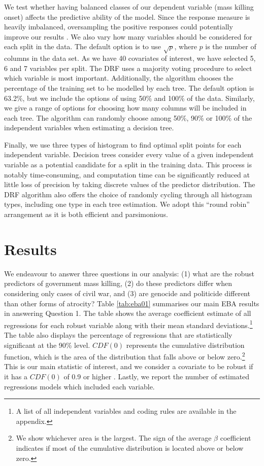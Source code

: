 \documentclass[a4paper,12pt]{article}
\begin{document}
We test whether having balanced classes of our dependent variable (mass killing onset) affects the predictive ability of the model. Since the response measure is heavily imbalanced, oversampling the positive responses could potentially improve our results \citep{chawla2004special,del2014use,japkowicz2002class}. 
We also vary how many variables should be considered for each split in the data. The default option is to use $\sqrt{p}$, where $p$ is the number of columns in the data set. As we have 40 covariates of interest, we have selected 5, 6 and 7 variables per split. The DRF uses a majority voting procedure to select which variable is most important. Additionally, the algorithm chooses the percentage of the training set to be modelled by each tree. The default option is 63.2\%, but we include the options of using 50\% and 100\% of the data. Similarly, we give a range of options for choosing how many columns will be included in each tree. The algorithm can randomly choose among 50\%, 90\% or 100\% of the independent variables when estimating a decision tree.

Finally, we use three types of histogram to find optimal split points for each independent variable. Decision trees consider every value of a given independent variable as a potential candidate for a split in the training data. This process is notably time-consuming, and computation time can be significantly reduced at little loss of precision by taking discrete values of the predictor distribution. The DRF algorithm also offers the choice of randomly cycling through all histogram types, including one type in each tree estimation. We adopt this ``round robin'' arrangement as it is both efficient and parsimonious.
	
\section{Results}
\label{sec:results}
	
We endeavour to answer three questions in our analysis: (1) what are the robust predictors of government mass killing, (2) do these predictors differ when considering only cases of civil war, and (3) are genocide and politicide different than other forms of atrocity? Table \ref{tab:eba01} summarises our main EBA results in answering Question 1. The table shows the average coefficient estimate of all regressions for each robust variable along with their mean standard deviations.\footnote{A list of all independent variables and coding rules are available in the appendix.} The table also displays the percentage of regressions that are statistically significant at the 90\% level. $CDF(0)$ represents the cumulative distribution function, which is the area of the distribution that falls above or below zero.\footnote{We show whichever area is the largest. The sign of the average $\beta$ coefficient indicates if most of the cumulative distribution is located above or below zero.} This is our main statistic of interest, and we consider a covariate to be robust if it has a $CDF(0)$ of 0.9 or higher \citep[181]{sala1997just}. Lastly, we report the number of estimated regressions models which included each variable.
\end{document}
